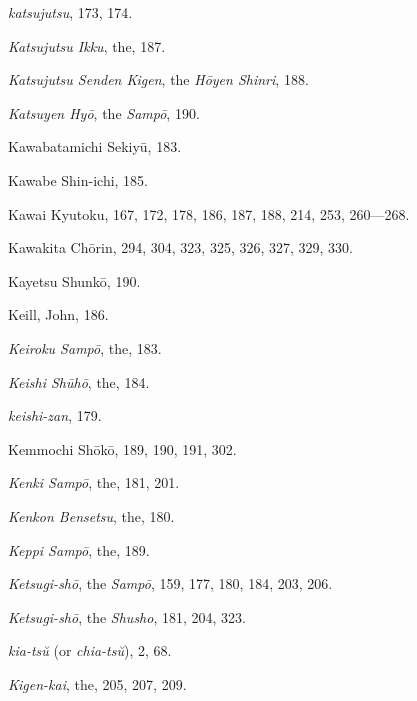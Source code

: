 \documentclass[11pt]{article}
\begin{document}
\emph{katsujutsu}, 173, 174.\par
\emph{Katsujutsu Ikku}, the, 187.\par
\emph{Katsujutsu Senden Kigen}, the \emph{Hōyen Shinri}, 188.\par
\emph{Katsuyen Hyō}, the \emph{Sampō}, 190.\par
Kawabatamichi Sekiyū, 183.\par
Kawabe Shin-ichi, 185.\par
Kawai Kyutoku, 167, 172, 178, 186, 187, 188, 214, 253, 260---268.\par
Kawakita Chōrin, 294, 304, 323, 325, 326, 327, 329, 330.\par
Kayetsu Shunkō, 190.\par
Keill, John, 186.\par
\emph{Keiroku Sampō}, the, 183.\par
\emph{Keishi Shūhō}, the, 184.\par
\emph{keishi-zan}, 179.\par
Kemmochi Shōkō, 189, 190, 191, 302.\par
\emph{Kenki Sampō}, the, 181, 201.\par
\emph{Kenkon Bensetsu}, the, 180.\par
\emph{Keppi Sampō}, the, 189.\par
\emph{Ketsugi-shō}, the \emph{Sampō}, 159, 177, 180, 184, 203, 206.\par
\emph{Ketsugi-shō}, the \emph{Shusho}, 181, 204, 323.\par
\emph{kia-tsŭ} (or \emph{chia-tsŭ}), 2, 68.\par
\emph{Kigen-kai}, the, 205, 207, 209.\par
\end{document}
